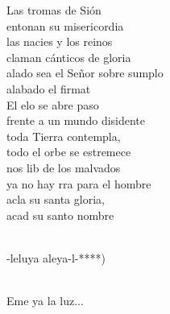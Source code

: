 \begin{cancion}
\jump
	Las tromas de Sión \\
entonan su misericordia\\
	las nacies y los reinos \\
claman cánticos de gloria\\
	alado sea el Señor sobre sumplo\\
	alabado el firmat\\
\jump
	El elo se abre paso \\
frente a un mundo disidente\\
	toda  Tierra contempla, \\
todo el orbe se estremece\\
	nos lib de los malvados  \\
	ya no hay rra para el hombre\\
	acla su santa gloria,\\
	 acad su santo nombre\\\jump\\
	\begin{chorus}%
	-leluya aleya-l-*)\\
	\end{chorus}%
	\jump\\
\jump
	Eme ya la luz...\\
\end{cancion}%
